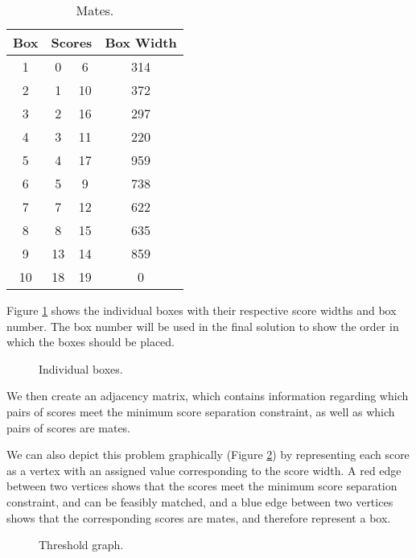 \documentclass[a4paper, 11pt, twoside, onecolumn, openany]{article}
\begin{document}
\begin{table}[!htb]
	\centering
	\begin{tabular}{|c|c|c|c|}
	\hline
	Box & \multicolumn{2}{|c|}{Scores} & Box Width \\ \hline
	1 & 0 & 6 & 314 \\ \hline
	2 & 1 & 10 & 372 \\ \hline
	3 & 2 & 16 & 297 \\ \hline
	4 & 3 & 11 & 220 \\ \hline
	5 & 4 & 17 & 959 \\ \hline
	6 & 5 & 9 & 738 \\ \hline
	7 & 7 & 12 & 622 \\ \hline
	8 & 8 & 15 & 635 \\ \hline
	9 & 13 & 14 & 859 \\ \hline
	10 & 18 & 19 & 0 \\
	\hline
	\end{tabular}
	\caption{Mates.}
	\label{table:mates}
\end{table}	

Figure \ref{fig:boxes} shows the individual boxes with their respective score widths and box number. The box number will be used in the final solution to show the order in which the boxes should be placed.

\begin{figure}[!htb]	
	\centering
	
	\caption{Individual boxes.}	
	\label{fig:boxes}
\end{figure}

We then create an adjacency matrix, which contains information regarding which pairs of scores meet the minimum score separation constraint, as well as which pairs of scores are mates.

We can also depict this problem graphically (Figure \ref{fig:threshold}) by representing each score as a vertex with an assigned value corresponding to the score width. A red edge between two vertices shows that the scores meet the minimum score separation constraint, and can be feasibly matched, and a blue edge between two vertices shows that the corresponding scores are mates, and therefore represent a box. 



\begin{figure}[!htb]
	\centering
	
	\caption{Threshold graph.}
	\label{fig:threshold}	
\end{figure}
\end{document}
